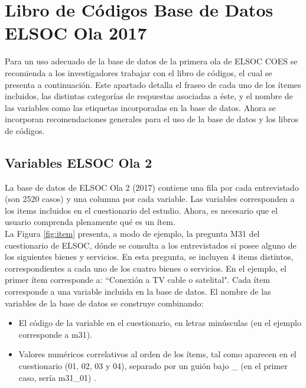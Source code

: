 \documentclass[12pt]{report}
\begin{document}
\newpage
\section*{Libro de Códigos Base de Datos ELSOC Ola 2017}

Para un uso adecuado de la base de datos de la primera ola de ELSOC COES se recomienda a los investigadores trabajar con el libro de códigos, el cual se presenta a continuación. Este apartado detalla el fraseo de cada uno de los ítemes incluidos, las distintas categorías de respuestas asociadas a éste, y el nombre de las variables como las etiquetas incorporadas en la base de datos. Ahora se incorporan recomendaciones generales para el uso de la base de datos y los libros de códigos.\\


\subsection*{Variables ELSOC Ola 2}

La base de datos de ELSOC Ola 2 (2017) contiene una fila por cada entrevistado (son 2520 casos) y una columna por cada variable. Las variables corresponden a los items incluidos en el cuestionario del estudio. Ahora, es necesario que el usuario comprenda plenamente qué es un  ítem. \\

La Figura  \ref{fig:item} presenta, a modo de ejemplo, la pregunta M31 del cuestionario de ELSOC, dónde se consulta a los entrevistados si posee alguno de los siguientes bienes y servicios. En esta pregunta, se incluyen 4 items distintos, correspondientes a cada uno de los cuatro bienes o servicios. En el ejemplo, el primer ítem corresponde a: ``Conexión a TV cable o satelital". Cada ítem corresponde a una variable incluida en la base de datos. El nombre de las variables de la base de datos se construye combinando:\\
\begin{itemize}
	\item El código de la variable en el cuestionario, en letras minúsculas (en el ejemplo corresponde a m31).
	\item Valores numéricos correlativos al orden de los ítems, tal como aparecen en el cuestionario (01, 02, 03 y 04), separado por un guión bajo \_ (en el primer caso, sería m31\_01) .
\end{itemize}
\end{document}
